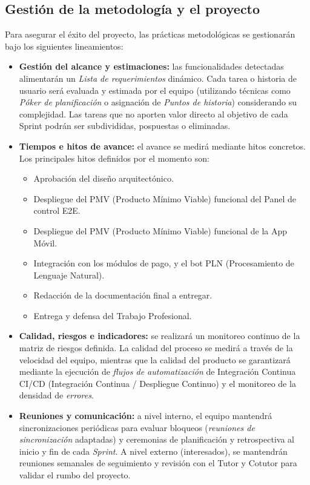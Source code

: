 \subsection{Gestión de la metodología y el proyecto}

Para asegurar el éxito del proyecto, las prácticas metodológicas se gestionarán bajo los siguientes lineamientos:

\begin{itemize}
    \item \textbf{Gestión del alcance y estimaciones:} las funcionalidades detectadas alimentarán un \textit{Lista de requerimientos} dinámico. Cada tarea o historia de usuario será evaluada y estimada por el equipo (utilizando técnicas como \textit{Póker de planificación} o asignación de \textit{Puntos de historia}) considerando su complejidad. Las tareas que no aporten valor directo al objetivo de cada Sprint podrán ser subdivididas, pospuestas o eliminadas.
    \item \textbf{Tiempos e hitos de avance:} el avance se medirá mediante hitos concretos. Los principales hitos definidos por el momento son:
    \begin{itemize}
        \item Aprobación del diseño arquitectónico.
        \item Despliegue del PMV (Producto Mínimo Viable) funcional del Panel de control E2E.
        \item Despliegue del PMV (Producto Mínimo Viable) funcional de la App Móvil.
        \item Integración con los módulos de pago, y el bot PLN (Procesamiento de Lenguaje Natural).
        \item Redacción de la documentación final a entregar.
        \item Entrega y defensa del Trabajo Profesional.
    \end{itemize}
    \newpage
    \item \textbf{Calidad, riesgos e indicadores:} se realizará un monitoreo continuo de la matriz de riesgos definida. La calidad del proceso se medirá a través de la velocidad del equipo, mientras que la calidad del producto se garantizará mediante la ejecución de \textit{flujos de automatización} de Integración Continua CI/CD (Integración Continua / Despliegue Continuo) y el monitoreo de la densidad de \textit{errores}.
    \item \textbf{Reuniones y comunicación:} a nivel interno, el equipo mantendrá sincronizaciones periódicas para evaluar bloqueos (\textit{reuniones de sincronización} adaptadas) y ceremonias de planificación y retrospectiva al inicio y fin de cada \textit{Sprint}. A nivel externo (interesados), se mantendrán reuniones semanales de seguimiento y revisión con el Tutor y Cotutor para validar el rumbo del proyecto.
\end{itemize}

